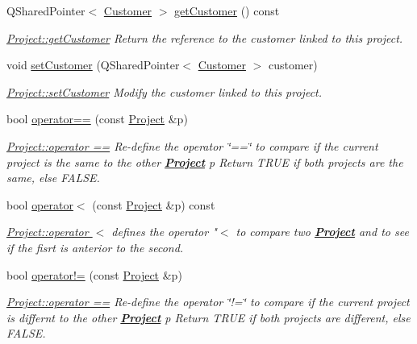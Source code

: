 \begin{DoxyCompactItemize}
Q\-Shared\-Pointer$<$ \hyperlink{classModels_1_1Customer}{Customer} $>$ \hyperlink{classModels_1_1Project_ad15f442a24c9d42144b73f27a7afaa35}{get\-Customer} () const 
\begin{DoxyCompactList}\small\item\em \hyperlink{classModels_1_1Project_ad15f442a24c9d42144b73f27a7afaa35}{Project\-::get\-Customer} Return the reference to the customer linked to this project. \end{DoxyCompactList}\item 
void \hyperlink{classModels_1_1Project_a9d305edf054735b911e144516d3eccba}{set\-Customer} (Q\-Shared\-Pointer$<$ \hyperlink{classModels_1_1Customer}{Customer} $>$ customer)
\begin{DoxyCompactList}\small\item\em \hyperlink{classModels_1_1Project_a9d305edf054735b911e144516d3eccba}{Project\-::set\-Customer} Modify the {\itshape customer} linked to this project. \end{DoxyCompactList}\item 
bool \hyperlink{classModels_1_1Project_a2f322e63f6b42273c24093b9df46c2d6}{operator==} (const \hyperlink{classModels_1_1Project}{Project} \&p)
\begin{DoxyCompactList}\small\item\em \hyperlink{classModels_1_1Project_a2f322e63f6b42273c24093b9df46c2d6}{Project\-::operator ==} Re-\/define the operator \char`\"{}==\char`\"{} to compare if the current project is the same to the other {\bfseries \hyperlink{classModels_1_1Project}{Project}} {\itshape p} Return T\-R\-U\-E if both projects are the same, else F\-A\-L\-S\-E. \end{DoxyCompactList}\item 
bool \hyperlink{classModels_1_1Project_a8e7cc264d433c708323faccae7bdd082}{operator$<$} (const \hyperlink{classModels_1_1Project}{Project} \&p) const 
\begin{DoxyCompactList}\small\item\em \hyperlink{classModels_1_1Project_a8e7cc264d433c708323faccae7bdd082}{Project\-::operator $<$} defines the operator "$<$ to compare two {\bfseries \hyperlink{classModels_1_1Project}{Project}} and to see if the fisrt is anterior to the second. \end{DoxyCompactList}\item 
bool \hyperlink{classModels_1_1Project_adf5947680a4eca62cd1cbda58a2a62f0}{operator!=} (const \hyperlink{classModels_1_1Project}{Project} \&p)
\begin{DoxyCompactList}\small\item\em \hyperlink{classModels_1_1Project_a2f322e63f6b42273c24093b9df46c2d6}{Project\-::operator ==} Re-\/define the operator \char`\"{}!=\char`\"{} to compare if the current project is differnt to the other {\bfseries \hyperlink{classModels_1_1Project}{Project}} {\itshape p} Return T\-R\-U\-E if both projects are different, else F\-A\-L\-S\-E. \end{DoxyCompactList}\end{DoxyCompactItemize}
